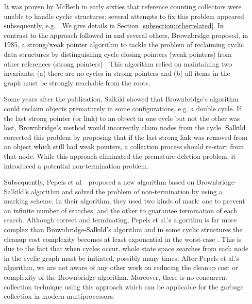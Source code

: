 It was proven by McBeth \cite{McBeth1963} in early sixties that reference counting collectors were unable to handle cyclic structures; several attempts to fix this problem appeared subsequently, e.g. \cite{Friedman1979,Bobrow1980,Lins2008}. We give details in Section \ref{subsection:otherrelated}.
In contrast to the approach followed in \cite{Friedman1979,Bobrow1980,Lins2008} and several others,
Brownbridge \cite{Brownbridge1985} proposed, in 1985, a strong/weak pointer algorithm to tackle the problem of reclaiming cyclic data structures by distinguishing cycle closing pointers (weak pointers) from other references (strong pointers) \cite{Jones1996}. %
This algorithm relied on maintaining two invariants: (a) there are no cycles in strong pointers and (b) all items in the graph must be strongly reachable from the roots.

Some years after the publication, Salkild \cite{Salkild1987} showed that Brownbridge's algorithm
\cite{Brownbridge1985} could reclaim objects prematurely in some
configurations, e.g. a double cycle. If the last strong pointer (or link) to
an object in one cycle but not the other was lost, Brownbridge's
method would incorrectly claim nodes from the cycle.
Salkild \cite{Salkild1987} corrected this problem by proposing
that if the last strong link was removed from an object which still
had weak pointers, a collection process should re-start from that node.
While this approach eliminated the premature deletion problem, it introduced a
potential non-termination problem.

Subsequently, Pepels et al.~\cite{Pepels1988} proposed a new algorithm based on
Brownbridge-Salkild's algorithm and solved the problem of non-termination by
using a marking scheme. In their algorithm, they used two kinds of mark: one to
prevent an infinite number of searches, and the other to guarantee termination
of each search. Although correct and terminating, Pepels et al.'s algorithm is far more
complex than Brownbridge-Salkild's algorithm and in some cyclic structures the
cleanup cost complexity becomes at least
exponential in the worst-case \cite{Jones1996}. This is due to the fact that when
cycles occur, whole state space searches from
each node in the cyclic graph must be initiated, possibly many times. After Pepels et al.'s algorithm, we are not aware
of any other work on reducing the cleanup cost or complexity of the Brownbridge
algorithm. Moreover, there is no concurrent collection technique using this approach which can be applicable for the garbage collection in modern multiprocessors.

